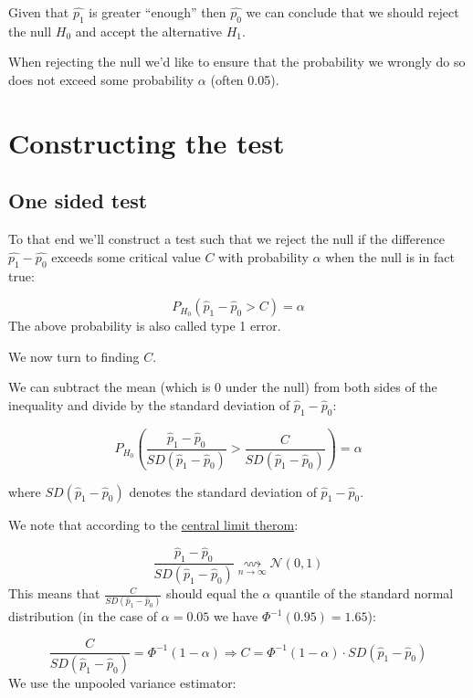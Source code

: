 \documentclass[
]{article}
\begin{document}
Given that \(\hat{p_1}\) is greater ``enough'' then \(\hat{p_0}\) we can
conclude that we should reject the null \(H_0\) and accept the
alternative \(H_1\).

When rejecting the null we'd like to ensure that the probability we
wrongly do so does not exceed some probability \(\alpha\) (often 0.05).

\hypertarget{constructing-the-test}{%
\section{Constructing the test}\label{constructing-the-test}}

\hypertarget{one-sided-test}{%
\subsection{One sided test}\label{one-sided-test}}

To that end we'll construct a test such that we reject the null if the
difference \(\hat{p_1} - \hat{p_0}\) exceeds some critical value \(C\)
with probability \(\alpha\) when the null is in fact true:

\[P_{H_0}(\hat{p}_1-\hat{p}_0>C)=\alpha\] The above probability is also
called type 1 error.

We now turn to finding \(C\).

We can subtract the mean (which is 0 under the null) from both sides of
the inequality and divide by the standard deviation of
\(\hat{p}_1-\hat{p}_0\):

\[P_{H_0}\left(\frac{\hat{p}_1-\hat{p}_0}{SD(\hat{p}_1-\hat{p}_0)}>\frac{C}{SD(\hat{p}_1-\hat{p}_0)}\right)=\alpha\]

where \(SD(\hat{p}_1-\hat{p}_0)\) denotes the standard deviation of
\(\hat{p}_1-\hat{p}_0\).

We note that according to the
\href{https://en.wikipedia.org/wiki/Central_limit_theorem}{central limit
therom}:

\[\frac{\hat{p}_1-\hat{p}_0}{SD(\hat{p}_1-\hat{p}_0)} \underset{n \rightarrow\infty}{\rightsquigarrow} \mathcal{N}(0,1)\]
This means that \(\frac{C}{SD(\hat{p}_1-\hat{p}_0)}\) should equal the
\(\alpha\) quantile of the standard normal distribution (in the case of
\(\alpha = 0.05\) we have \(\Phi^{-1}(0.95) = 1.65\)):

\[\frac{C}{SD(\hat{p}_1-\hat{p}_0)} = \Phi^{-1}(1 - \alpha) \Rightarrow C = \Phi^{-1}(1 - \alpha) \cdot SD(\hat{p}_1-\hat{p}_0)\]
We use the unpooled variance estimator:
\end{document}
